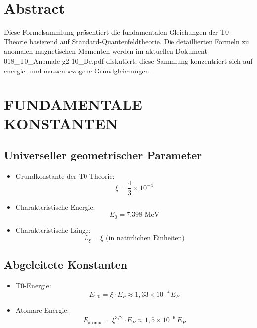 \section*{Abstract}
		Diese Formelsammlung präsentiert die fundamentalen Gleichungen der T0-Theorie basierend auf Standard-Quantenfeldtheorie. Die detaillierten Formeln zu anomalen magnetischen Momenten werden im aktuellen Dokument 018\_T0\_Anomale-g2-10\_De.pdf diskutiert; diese Sammlung konzentriert sich auf energie- und massenbezogene Grundgleichungen.

	
	
	\section{FUNDAMENTALE KONSTANTEN}
	
	\subsection{Universeller geometrischer Parameter}
	\begin{itemize}
		\item Grundkonstante der T0-Theorie:
		$$\boxed{\xi = \frac{4}{3} \times 10^{-4}}$$
		
		\item Charakteristische Energie:
		$$E_0 = 7.398 \text{ MeV}$$
		
		\item Charakteristische Länge:
		$$L_\xi = \xi \text{ (in natürlichen Einheiten)}$$
	\end{itemize}
	
	\subsection{Abgeleitete Konstanten}
	\begin{itemize}
		\item T0-Energie:
		$$E_{\text{T0}} = \xi \cdot E_P \approx 1{,}33 \times 10^{-4} \, E_P$$
		
		\item Atomare Energie:
		$$E_{\text{atomic}} = \xi^{3/2} \cdot E_P \approx 1{,}5 \times 10^{-6} \, E_P$$
	\end{itemize}
	

